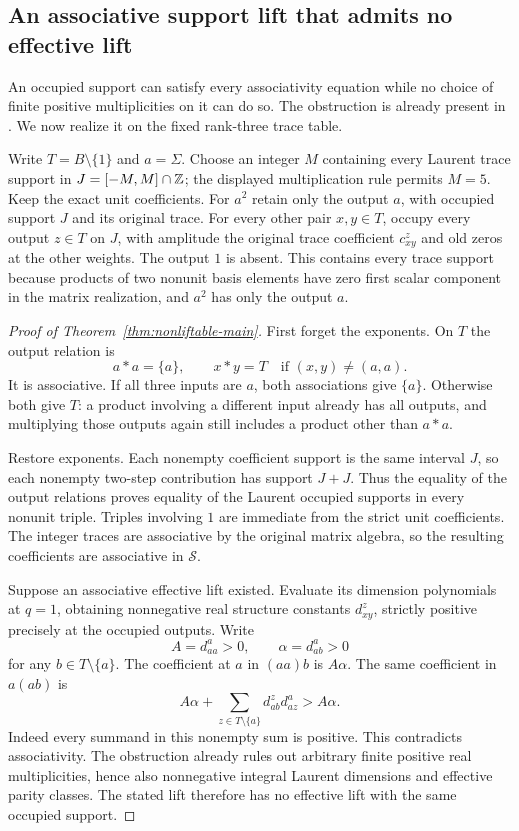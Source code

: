 \subsection{An associative support lift that admits no effective lift}
\label{sec:nonliftable}
An occupied support can satisfy every associativity equation while no choice of finite positive multiplicities on it can do so. The obstruction is already present in \citet[Proposition 12 and Corollary 13, \S6.2--6.3; arXiv version, p.\ 15]{Forsberg}. We now realize it on the fixed rank-three trace table.

Write $T=B\setminus\{1\}$ and $a=\Sigma$. Choose an integer $M$ containing every Laurent trace support in $J=[-M,M]\cap\mathbb Z$; the displayed multiplication rule permits $M=5$. Keep the exact unit coefficients. For $a^2$ retain only the output $a$, with occupied support $J$ and its original trace. For every other pair $x,y\in T$, occupy every output $z\in T$ on $J$, with amplitude the original trace coefficient $c_{xy}^z$ and old zeros at the other weights. The output $1$ is absent. This contains every trace support because products of two nonunit basis elements have zero first scalar component in the matrix realization, and $a^2$ has only the output $a$.

\begin{proof}[Proof of Theorem~\ref{thm:nonliftable-main}]
First forget the exponents. On $T$ the output relation is
\[
 a*a=\{a\},\qquad x*y=T\quad\text{if }(x,y)\ne(a,a).
\]
It is associative. If all three inputs are $a$, both associations give $\{a\}$. Otherwise both give $T$: a product involving a different input already has all outputs, and multiplying those outputs again still includes a product other than $a*a$.

Restore exponents. Each nonempty coefficient support is the same interval $J$, so each nonempty two-step contribution has support $J+J$. Thus the equality of the output relations proves equality of the Laurent occupied supports in every nonunit triple. Triples involving $1$ are immediate from the strict unit coefficients. The integer traces are associative by the original matrix algebra, so the resulting coefficients are associative in $\mathcal S$.

Suppose an associative effective lift existed. Evaluate its dimension polynomials at $q=1$, obtaining nonnegative real structure constants $d_{xy}^z$, strictly positive precisely at the occupied outputs. Write
\[
 A=d_{aa}^a>0,\qquad \alpha=d_{ab}^a>0
\]
for any $b\in T\setminus\{a\}$. The coefficient at $a$ in $(aa)b$ is $A\alpha$. The same coefficient in $a(ab)$ is
\[
 A\alpha+\sum_{z\in T\setminus\{a\}}d_{ab}^z d_{az}^a
 >A\alpha.
\]
Indeed every summand in this nonempty sum is positive. This contradicts associativity. The obstruction already rules out arbitrary finite positive real multiplicities, hence also nonnegative integral Laurent dimensions and effective parity classes. The stated lift therefore has no effective lift with the same occupied support.
\end{proof}


